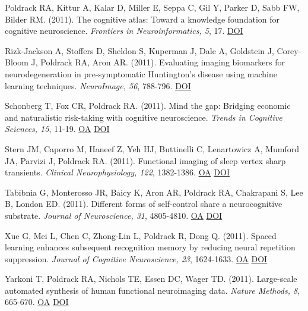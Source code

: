 \documentclass[10pt, letterpaper]{article}
\begin{document}
Poldrack RA, Kittur A, Kalar D, Miller E, Seppa C, Gil Y, Parker D, Sabb FW, Bilder RM.  (2011). The cognitive atlas: Toward a knowledge foundation for cognitive neuroscience. \textit{Frontiers in Neuroinformatics, 5}, 17. \href{https://doi.org/10.3389/fninf.2011.00017}{DOI} \vspace{2mm}

Rizk-Jackson A, Stoffers D, Sheldon S, Kuperman J, Dale A, Goldstein J, Corey-Bloom J, Poldrack RA, Aron AR.  (2011). Evaluating imaging biomarkers for neurodegeneration in pre-symptomatic Huntington's disease using machine learning techniques. \textit{NeuroImage, 56}, 788-796. \href{https://doi.org/10.1016/j.neuroimage.2010.04.273}{DOI} \vspace{2mm}

Schonberg T, Fox CR, Poldrack RA.  (2011). Mind the gap: Bridging economic and naturalistic risk-taking with cognitive neuroscience. \textit{Trends in Cognitive Sciences, 15}, 11-19. \href{https://www.ncbi.nlm.nih.gov/pmc/articles/PMC3014440}{OA} \href{https://doi.org/10.1016/j.tics.2010.10.002}{DOI} \vspace{2mm}

Stern JM, Caporro M, Haneef Z, Yeh HJ, Buttinelli C, Lenartowicz A, Mumford JA, Parvizi J, Poldrack RA.  (2011). Functional imaging of sleep vertex sharp transients. \textit{Clinical Neurophysiology, 122}, 1382-1386. \href{https://www.ncbi.nlm.nih.gov/pmc/articles/PMC3105179}{OA} \href{https://doi.org/10.1016/j.clinph.2010.12.049}{DOI} \vspace{2mm}

Tabibnia G, Monterosso JR, Baicy K, Aron AR, Poldrack RA, Chakrapani S, Lee B, London ED.  (2011). Different forms of self-control share a neurocognitive substrate. \textit{Journal of Neuroscience, 31}, 4805-4810. \href{https://www.ncbi.nlm.nih.gov/pmc/articles/PMC3096483}{OA} \href{https://doi.org/10.1523/jneurosci.2859-10.2011}{DOI} \vspace{2mm}

Xue G, Mei L, Chen C, Zhong-Lin L, Poldrack R, Dong Q.  (2011). Spaced learning enhances subsequent recognition memory by reducing neural repetition suppression. \textit{Journal of Cognitive Neuroscience, 23}, 1624-1633. \href{https://www.ncbi.nlm.nih.gov/pmc/articles/PMC3297428}{OA} \href{https://doi.org/10.1162/jocn.2010.21532}{DOI} \vspace{2mm}

Yarkoni T, Poldrack RA, Nichols TE, Essen DC, Wager TD.  (2011). Large-scale automated synthesis of human functional neuroimaging data. \textit{Nature Methods, 8}, 665-670. \href{https://www.ncbi.nlm.nih.gov/pmc/articles/PMC3146590}{OA} \href{https://doi.org/10.1038/nmeth.1635}{DOI} \vspace{2mm}
\end{document}
